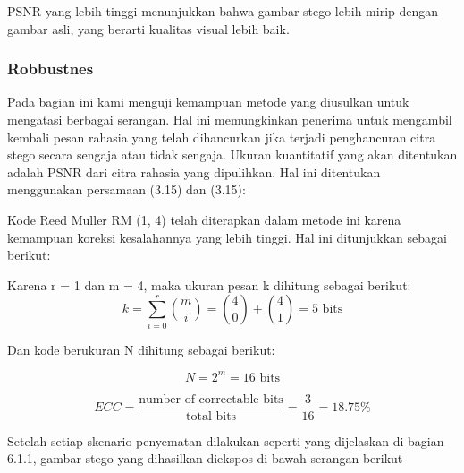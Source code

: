 \documentclass{ittelkom}
\begin{document}
PSNR yang lebih tinggi menunjukkan bahwa gambar stego lebih mirip dengan gambar
asli, yang berarti kualitas visual lebih baik.

\subsubsection{Robbustnes}

Pada bagian ini kami menguji kemampuan metode yang diusulkan untuk mengatasi
berbagai serangan. Hal ini memungkinkan penerima untuk mengambil kembali pesan
rahasia yang telah dihancurkan jika terjadi penghancuran citra stego secara
sengaja atau tidak sengaja. Ukuran kuantitatif yang akan ditentukan adalah PSNR
dari citra rahasia yang dipulihkan. Hal ini ditentukan menggunakan persamaan
(3.15) dan (3.15):

Kode Reed Muller RM (1, 4) telah diterapkan dalam metode ini karena kemampuan
koreksi kesalahannya yang lebih tinggi. Hal ini ditunjukkan sebagai berikut:

Karena r = 1 dan m = 4, maka ukuran pesan k dihitung sebagai berikut:
\begin{equation}
    k = \sum_{i=0}^{r} \binom{m}{i} = \binom{4}{0} + \binom{4}{1} = 5 \text{ bits}
    \label{eq:rm}
\end{equation}

Dan kode berukuran N dihitung sebagai berikut:

\begin{equation}
    N = 2^m = 16 \text{ bits}
    \label{eq:rm2}
\end{equation}

\begin{equation}
    ECC = \frac{\text{number of correctable bits}}{\text{total bits}} = \frac{3}{16} = 18.75\%
\end{equation}

Setelah setiap skenario penyematan dilakukan seperti yang dijelaskan di bagian
6.1.1, gambar stego yang dihasilkan diekspos di bawah serangan berikut
\end{document}
